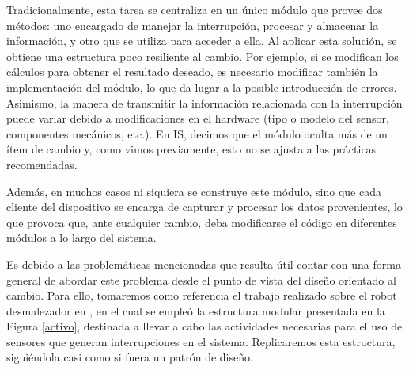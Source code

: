 Tradicionalmente, esta tarea se centraliza en un único módulo que provee dos métodos: uno encargado de manejar la interrupción, procesar y almacenar la información, y otro que se utiliza para acceder a ella. Al aplicar esta solución, se obtiene una estructura poco resiliente al cambio. Por ejemplo, si se modifican los cálculos para obtener el resultado deseado, es necesario modificar también la implementación del módulo, lo que da lugar a la posible introducción de errores. Asimismo, la manera de transmitir la información relacionada con la interrupción puede variar debido a modificaciones en el hardware (tipo o modelo del sensor, componentes mecánicos, etc.). En \gls{IS}, decimos que el módulo oculta más de un ítem de cambio y, como vimos previamente, esto no se ajusta a las prácticas recomendadas.

Además, en muchos casos ni siquiera se construye este módulo, sino que cada cliente del dispositivo se encarga de capturar y procesar los datos provenientes, lo que provoca que, ante cualquier cambio, deba modificarse el código en diferentes módulos a lo largo del sistema.

Es debido a las problemáticas mencionadas que resulta útil contar con una forma general de abordar este problema desde el punto de vista del diseño orientado al cambio. Para ello, tomaremos como referencia el trabajo realizado sobre el robot desmalezador en \cite{paperPomponio}, en el cual se empleó la estructura modular presentada en la Figura \ref{activo}, destinada a llevar a cabo las actividades necesarias para el uso de sensores que generan interrupciones en el sistema. Replicaremos esta estructura, siguiéndola casi como si fuera un patrón de diseño.

